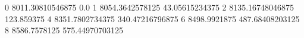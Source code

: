 0 8011.30810546875 0.0
1 8054.3642578125 43.05615234375
2 8135.16748046875 123.859375
4 8351.7802734375 340.47216796875
6 8498.9921875 487.68408203125
8 8586.7578125 575.44970703125

